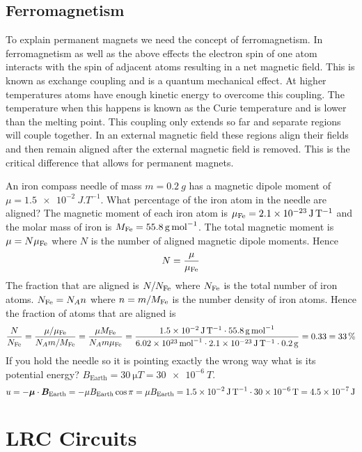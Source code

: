 \documentclass{article}
\begin{document}
    \subsection{Ferromagnetism}
    To explain permanent magnets we need the concept of ferromagnetism.
    In ferromagnetism as well as the above effects the electron spin of one atom interacts with the spin of adjacent atoms resulting in a net magnetic field.
    This is known as exchange coupling and is a quantum mechanical effect.
    At higher temperatures atoms have enough kinetic energy to overcome this coupling.
    The temperature when this happens is known as the Curie temperature and is lower than the melting point.
    This coupling only extends so far and separate regions will couple together.
    In an external magnetic field these regions align their fields and then remain aligned after the external magnetic field is removed.
    This is the critical difference that allows for permanent magnets.
    
    \example
    An iron compass needle of mass \(m = \SI{0.2}{g}\) has a magnetic dipole moment of \(\mu = \SI{1.5e-2}{J.T^{-1}}\).
    What percentage of the iron atom in the needle are aligned?
    The magnetic moment of each iron atom is \(\mu_{\ce{Fe}} = \SI{2.1e-23}{J.T^{-1}}\) and the molar mass of iron is \(M_{\ce{Fe}} = \SI{55.8}{g.mol^{-1}}\).
    The total magnetic moment is \(\mu = N\mu_{\ce{Fe}}\) where \(N\) is the number of aligned magnetic dipole moments.
    Hence
    \[N = \frac{\mu}{\mu_{\ce{Fe}}}\]
    The fraction that are aligned is \(N/N_{\ce{Fe}}\) where \(N_{\ce{Fe}}\) is the total number of iron atoms.
    \(N_{\ce{Fe}} = N_An\) where \(n = m/M_{\ce{Fe}}\) is the number density of iron atoms.
    Hence the fraction of atoms that are aligned is
    \[\frac{N}{N_{\ce{Fe}}} = \frac{\mu/\mu_{\ce{Fe}}}{N_A m/M_{\ce{Fe}}} = \frac{\mu M_{\ce{Fe}}}{N_Am\mu_{\ce{Fe}}} = \frac{\SI{1.5e-2}{J.T^{-1}}\cdot \SI{55.8}{g.mol^{-1}}}{\SI{6.02e23}{mol^{-1}}\cdot\SI{2.1e-23}{J.T^{-1}}\cdot\SI{0.2}{g}} = 0.33 = \SI{33}{\%}\]
    If you hold the needle so it is pointing exactly the wrong way what is its potential energy?
    \(B_\text{Earth} = \SI{30}{\micro T} = \SI{30e-6}{T}\).
    \[u = -\bm{\mu}\cdot\bm{B}_\text{Earth} = -\mu B_\text{Earth}\cos\pi = \mu B_\text{Earth} = \SI{1.5e-2}{J.T^{-1}}\cdot\SI{30e-6}{T} = \SI{4.5e-7}{J}\]
    
    \section{LRC Circuits}
\end{document}
